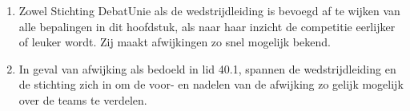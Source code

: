 
\begin{enumerate}
\item Zowel Stichting DebatUnie als de wedstrijdleiding is bevoegd af te wijken van alle bepalingen in dit hoofdstuk, als naar haar inzicht de competitie eerlijker of leuker wordt. Zij maakt afwijkingen zo snel mogelijk bekend.
\item In geval van afwijking als bedoeld in lid 40.1, spannen de wedstrijdleiding en de stichting zich in om de voor- en nadelen van de afwijking zo gelijk mogelijk over de teams te verdelen.
\end{enumerate}
